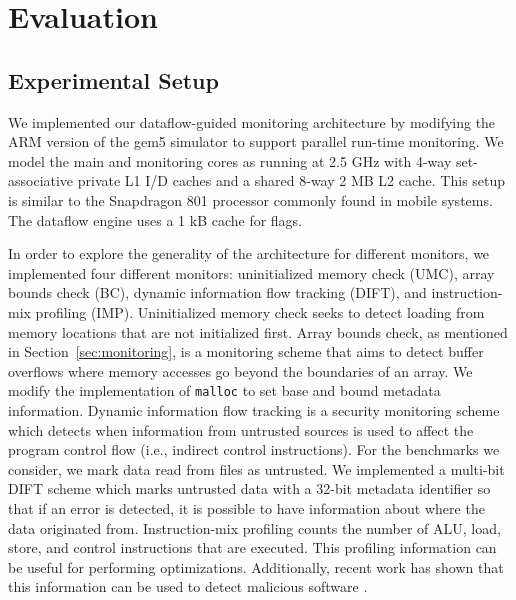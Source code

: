 \section{Evaluation}
\label{sec:evaluation}

\subsection{Experimental Setup}
\label{sec:evaluation.setup}

We implemented our dataflow-guided monitoring architecture by
modifying the ARM version of the gem5 simulator \cite{gem5} to support parallel
run-time monitoring. We model the main and monitoring cores as running at 2.5
GHz with 4-way set-associative private L1 I/D caches and a shared 8-way 2 MB L2
cache. This setup is similar to the Snapdragon 801 processor commonly found in
mobile systems. The dataflow engine uses a 1 kB cache for flags.

In order to explore the generality of the architecture for
different monitors, we implemented four different monitors: uninitialized
memory check (UMC), array bounds check (BC), dynamic information flow
tracking (DIFT), and instruction-mix profiling (IMP).  Uninitialized memory
check seeks to detect loading from
memory locations that are not initialized first. Array bounds check, as
mentioned in Section~\ref{sec:monitoring}, is a monitoring scheme that aims to
detect buffer overflows where memory accesses go beyond the boundaries of an
array. We modify the implementation of {\tt malloc} to set base and bound
metadata information. Dynamic information flow tracking is a security
monitoring scheme
which detects when information from untrusted sources is used to affect the
program control flow (i.e., indirect control instructions). For the benchmarks we consider, we mark data read from
files as untrusted. We implemented a multi-bit DIFT scheme which marks
untrusted data with a 32-bit metadata identifier so
that if an error is detected, it is possible to have information about where
the data originated from. Instruction-mix profiling counts the number of ALU,
load, store, and control instructions that are executed. This profiling
information can be useful for performing optimizations. Additionally, recent
work has shown that this information can be used to detect malicious software \cite{tang-raid14}.


